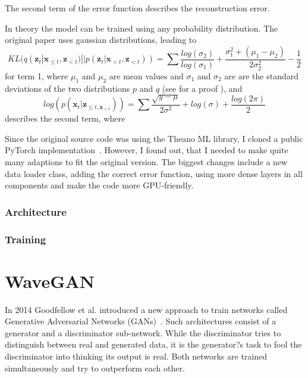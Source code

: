 \documentclass[12pt]{article}
\begin{document}
The second term of the error function describes the reconstruction error.

In theory the model can be trained using any probability distribution.
The original paper uses gaussian distributions, leading to
$$
KL(q(\mathbf{z}_t | \mathbf{x}_{\le t}, \mathbf{z}_{<t}) || p(\mathbf{z}_t | \mathbf{x}_{<t}, \mathbf{z}_{<t}))
= \sum \frac{log(\sigma_2)}{log(\sigma_1)}+\frac{\sigma_1^2 + (\mu_1 - \mu_2)}{2 \sigma_2^2} - \frac{1}{2}
$$
for term 1, where $\mu_1$ and $\mu_2$ are mean values and $\sigma_1$ and $\sigma_2$ are are the standard deviations of the two distributions $p$ and $q$ (see \cite{klproof} for a proof ), and
$$
log(p(\mathbf{x}_t | \mathbf{z}_{\le t, \mathbf{x}_{<t}}))
= \sum \frac{\sqrt{y-\mu}}{2 \sigma^2} + log(\sigma) + \frac{log(2\pi)}{2}
$$
describes the second term, where %


Since the original source code was using the Theano ML library, I cloned a public PyTorch implementation~\cite{VRNNgit}.
However, I found out, that I needed to make quite many adaptions to fit the original version.
The biggest changes include a new data loader class, adding the correct error function, using more dense layers in all components and make the code more GPU-friendly. 



\subsubsection{Architecture}
\subsubsection{Training}









\section{WaveGAN}
In 2014 Goodfellow et al. introduced a new approach to train networks called Generative Adversarial Networks (GANs)~\cite{goodfellow2014generative}.
Such architectures consist of a generator and a discriminator sub-network.
While the discriminator tries to distinguish between real and generated data, it is the generator?s task to fool the discriminator into thinking its output is real.
Both networks are trained simultaneously and try to outperform each other.
\end{document}
